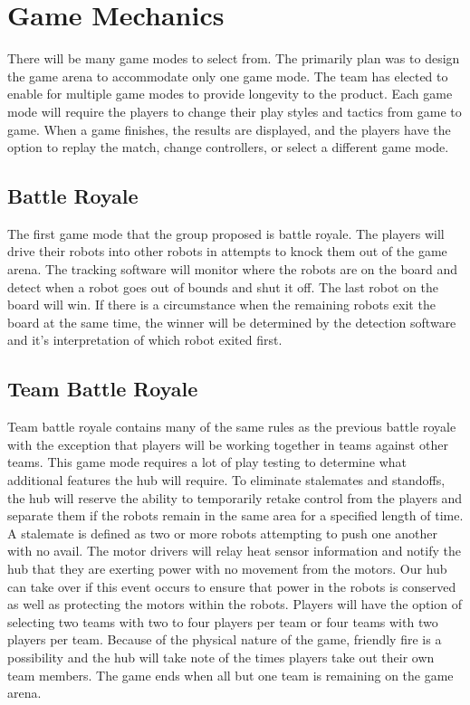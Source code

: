 \documentclass[11pt]{ieeeconf}
\begin{document}
\section{Game Mechanics}

There will be many game modes to select from. The primarily plan was to design the game arena to accommodate only one game mode. The team has elected to enable for multiple game modes to provide longevity to the product. Each game mode will require the players to change their play styles and tactics from game to game. When a game finishes, the results are displayed, and the players have the option to replay the match, change controllers, or select a different game mode.

\subsection{Battle Royale}

The first game mode that the group proposed is battle royale. The players will drive their robots into other robots in attempts to knock them out of the game arena. The tracking software will monitor where the robots are on the board and detect when a robot goes out of bounds and shut it off. The last robot on the board will win. If there is a circumstance when the remaining robots exit the board at the same time, the winner will be determined by the detection software and it's interpretation of which robot exited first.  

\subsection{Team Battle Royale}

Team battle royale contains many of the same rules as the previous battle royale with the exception that players will be working together in teams against other teams. This game mode requires a lot of play testing to determine what additional features the hub will require. To eliminate stalemates and standoffs, the hub will reserve the ability to temporarily retake control from the players and separate them if the robots remain in the same area for a specified length of time. A stalemate is defined as two or more robots attempting to push one another with no avail. The motor drivers will relay heat sensor information and notify the hub that they are exerting power with no movement from the motors. Our hub can take over if this event occurs to ensure that power in the robots is conserved as well as protecting the motors within the robots. Players will have the option of selecting two teams with two to four players per team or four teams with two players per team. Because of the physical nature of the game, friendly fire is a possibility and the hub will take note of the times players take out their own team members. The game ends when all but one team is remaining on the game arena. 
\end{document}
